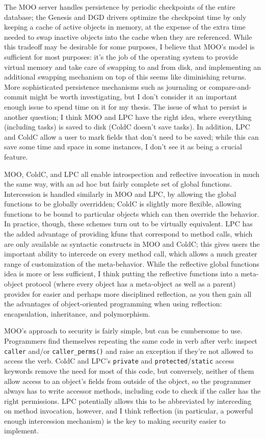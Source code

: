 \documentclass{article}
\begin{document}
The MOO server handles persistence by periodic checkpoints of the
entire database; the Genesis and DGD drivers optimize the checkpoint
time by only keeping a cache of active objects in memory, at the
expense of the extra time needed to swap inactive objects into the
cache when they are referenced.  While this tradeoff may be desirable
for some purposes, I believe that MOO's model is sufficient for most
purposes: it's the job of the operating system to provide virtual
memory and take care of swapping to and from disk, and implementing an
additional swapping mechanism on top of this seems like diminishing
returns.  More sophisticated persistence mechanisms such as journaling
or compare-and-commit might be worth investigating, but I don't
consider it an important enough issue to spend time on it for my
thesis.  The issue of what to persist is another question; I think MOO
and LPC have the right idea, where everything (including tasks) is
saved to disk (ColdC doesn't save tasks).  In addition, LPC and ColdC
allow a user to mark fields that don't need to be saved; while this
can save some time and space in some instances, I don't see it as
being a crucial feature.

MOO, ColdC, and LPC all enable introspection and reflective invocation
in much the same way, with an ad hoc but fairly complete set of global
functions.  Intercession is handled similarly in MOO and LPC, by
allowing the global functions to be globally overridden; ColdC is
slightly more flexible, allowing functions to be bound to particular
objects which can then override the behavior.  In practice, though,
these schemes turn out to be virtually equivalent.  LPC has the added
advantage of providing kfuns that correspond to method calls, which
are only available as syntactic constructs in MOO and ColdC; this
gives users the important ability to intercede on every method call,
which allows a much greater range of customization of the
meta-behavior.  While the reflective global functions idea is more or
less sufficient, I think putting the reflective functions into a
meta-object protocol (where every object has a meta-object as well as
a parent) provides for easier and perhaps more disciplined reflection,
as you then gain all the advantages of object-oriented programming
when using reflection: encapsulation, inheritance, and polymorphism.

MOO's approach to security is fairly simple, but can be cumbersome to
use.  Programmers find themselves repeating the same code in verb
after verb: inspect \texttt{caller} and/or \texttt{caller\_perms()}
and raise an exception if they're not allowed to access the verb.
ColdC and LPC's \texttt{private} and
\texttt{protected}/\texttt{static} access keywords remove the need for 
most of this code, but conversely, neither of them allow access to
an object's fields from outside of the object, so the programmer
always has to write accessor methods, including code to check if the
caller has the right permissions.  LPC potentially allows this to be
abbreviated by interceding on method invocation, however, and I think
reflection (in particular, a powerful enough intercession mechanism)
is the key to making security easier to implement.
\end{document}
